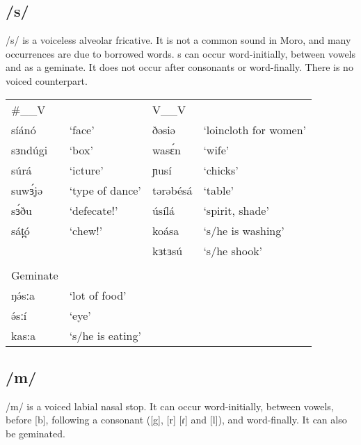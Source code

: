\subsection{/s/}
/s/ is a voiceless alveolar fricative. It is not a common sound in Moro, and many occurrences are due to borrowed words. s can occur word-initially, between vowels and as a geminate. It does not occur after consonants or word-finally. There is no voiced counterpart. 

\ea
\begin{supertabular}[t]{llll}
\#\_\_V	&&	V\_\_V		\\
síánó	&‘face’		&ðəsiə	&‘loincloth for women’\\
sɜndúgi	&‘box’		&wasɛ́n	&‘wife’\\
súrá	&‘icture’	&ɲusí	&‘chicks’\\
suwɜ́jə	&‘type of dance’ 	&tərəbésá	&‘table’\\

sɜ́ðu	&‘defecate!’	&úsílá	&‘spirit, shade’\\
sát̪ó	&‘chew!’	&koása	&‘s/he is washing’\\
					&&kɜtɜsú	&‘s/he shook’\\
&\\
\midrule
Geminate\\
\midrule
ŋə́sːa	&‘lot of food’		\\
ə́sːí		&‘eye’		\\
kas:a	&‘s/he is eating’	\\
\end{supertabular}\label{ex:ch2:30}	
\z 

\subsection{/m/}
/m/ is a voiced labial nasal stop. It can occur word-initially, between vowels, before [b], following a consonant ([g], [r] [ɾ] and [l]), and word-finally. It can also be geminated. 

